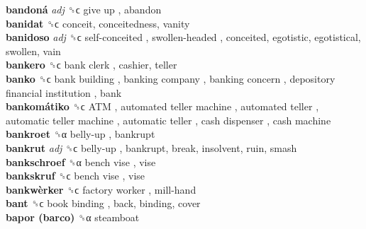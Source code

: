 \textbf{bandoná} \emph{adj}  ␝ϲ   give up , abandon  \\
\textbf{banidat} ␝ϲ  conceit, conceitedness, vanity  \\
\textbf{banidoso} \emph{adj}  ␝ϲ   self-conceited ,  swollen-headed , conceited, egotistic, egotistical, swollen, vain  \\
\textbf{bankero} ␝ϲ   bank clerk , cashier, teller  \\
\textbf{banko} ␝ϲ   bank building ,  banking company ,  banking concern ,  depository financial institution , bank  \\
\textbf{bankomátiko} ␝ϲ   ATM ,  automated teller machine ,  automated teller ,  automatic teller machine ,  automatic teller ,  cash dispenser ,  cash machine   \\
\textbf{bankroet} ␝α   belly-up , bankrupt  \\
\textbf{bankrut} \emph{adj}  ␝ϲ   belly-up , bankrupt, break, insolvent, ruin, smash  \\
\textbf{bankschroef} ␝α   bench vise , vise  \\
\textbf{bankskruf} ␝ϲ   bench vise , vise  \\
\textbf{bankwèrker} ␝ϲ   factory worker ,  mill-hand   \\
\textbf{bant} ␝ϲ   book binding , back, binding, cover  \\
\textbf{bapor (barco)} ␝α  steamboat  \\
